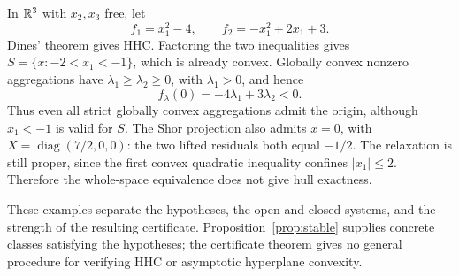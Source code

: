 \begin{example}\label{ex:strip}
In $\mathbb R^3$ with $x_2,x_3$ free, let
\[
 f_1=x_1^2-4,\qquad f_2=-x_1^2+2x_1+3.
\]
Dines' theorem gives HHC. Factoring the two inequalities gives
$S=\{x:-2<x_1<-1\}$, which is already convex.
Globally convex nonzero aggregations have
$\lambda_1\geq\lambda_2\geq0$, with $\lambda_1>0$, and hence
\[
 f_\lambda(0)=-4\lambda_1+3\lambda_2<0.
\]
Thus even all strict globally convex aggregations admit the origin,
although $x_1<-1$ is valid for $S$. The Shor projection also admits
$x=0$, with $X=\operatorname{diag}(7/2,0,0)$: the two lifted
residuals both equal $-1/2$.
The relaxation is still proper, since the first convex quadratic
inequality confines $|x_1|\leq2$. Therefore the whole-space
equivalence does not give hull exactness.
\end{example}

These examples separate the hypotheses, the open and closed systems,
and the strength of the resulting certificate. Proposition~\ref{prop:stable}
supplies concrete classes satisfying the hypotheses; the certificate
theorem gives no general procedure for verifying HHC or asymptotic
hyperplane convexity.
